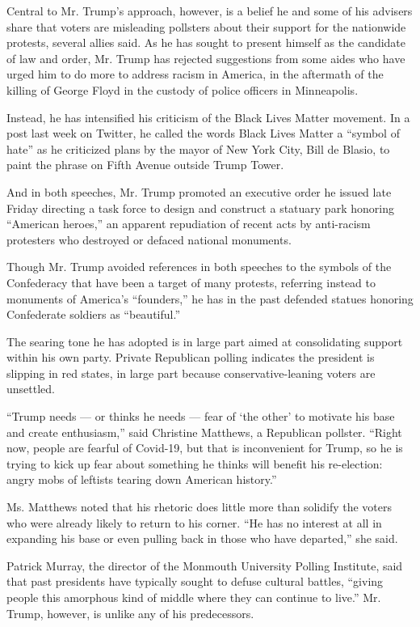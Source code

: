 Central to Mr. Trump's approach, however, is a belief he and some of his
advisers share that voters are misleading pollsters about their support
for the nationwide protests, several allies said. As he has sought to
present himself as the candidate of law and order, Mr. Trump has
rejected suggestions from some aides who have urged him to do more to
address racism in America, in the aftermath of the killing of George
Floyd in the custody of police officers in Minneapolis.

Instead, he has intensified his criticism of the Black Lives Matter
movement. In a post last week on Twitter, he called the words Black
Lives Matter a ``symbol of hate'' as he criticized plans by the mayor of
New York City, Bill de Blasio, to paint the phrase on Fifth Avenue
outside Trump Tower.

And in both speeches, Mr. Trump promoted an executive order he issued
late Friday directing a task force to design and construct a statuary
park honoring ``American heroes,'' an apparent repudiation of recent
acts by anti-racism protesters who destroyed or defaced national
monuments.

Though Mr. Trump avoided references in both speeches to the symbols of
the Confederacy that have been a target of many protests, referring
instead to monuments of America's ``founders,'' he has in the past
defended statues honoring Confederate soldiers as ``beautiful.''

The searing tone he has adopted is in large part aimed at consolidating
support within his own party. Private Republican polling indicates the
president is slipping in red states, in large part because
conservative-leaning voters are unsettled.

``Trump needs --- or thinks he needs --- fear of `the other' to motivate
his base and create enthusiasm,'' said Christine Matthews, a Republican
pollster. ``Right now, people are fearful of Covid-19, but that is
inconvenient for Trump, so he is trying to kick up fear about something
he thinks will benefit his re-election: angry mobs of leftists tearing
down American history.''

Ms. Matthews noted that his rhetoric does little more than solidify the
voters who were already likely to return to his corner. ``He has no
interest at all in expanding his base or even pulling back in those who
have departed,'' she said.

Patrick Murray, the director of the Monmouth University Polling
Institute, said that past presidents have typically sought to defuse
cultural battles, ``giving people this amorphous kind of middle where
they can continue to live.'' Mr. Trump, however, is unlike any of his
predecessors.


